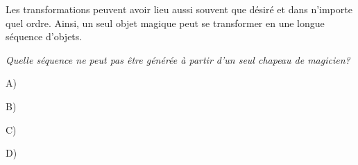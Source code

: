 {Les transformations peuvent avoir lieu aussi souvent que désiré et dans n’importe quel ordre. Ainsi, un seul objet magique peut se transformer en une longue séquence d’objets.



{\em
Quelle séquence ne peut pas être générée à partir d’un seul chapeau de magicien?


}

A) \raisebox{-0.5ex}{}

B) \raisebox{-0.5ex}{}

C) \raisebox{-0.5ex}{}

D) \raisebox{-0.5ex}{}



}
